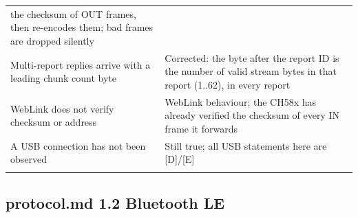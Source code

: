 {\begin{longtable}[]{@{}
  >{\raggedright\arraybackslash}p{}
  >{\raggedright\arraybackslash}p{}@{}}
the checksum of OUT frames, then re-encodes them; bad frames are dropped
silently \\
Multi-report replies arrive with a leading chunk count byte & Corrected:
the byte after the report ID is the number of valid stream bytes in that
report (1..62), in every report \\
WebLink does not verify checksum or address & WebLink behaviour; the
CH58x has already verified the checksum of every IN frame it forwards \\
A USB connection has not been observed & Still true; all USB statements
here are {[}D{]}/{[}E{]} \\*
\end{longtable}
}

\subsection{protocol.md 1.2 Bluetooth
LE}\label{protocol.md-1.2-bluetooth-le}

